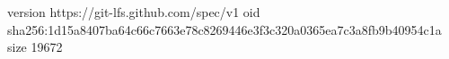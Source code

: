 version https://git-lfs.github.com/spec/v1
oid sha256:1d15a8407ba64c66c7663e78c8269446e3f3c320a0365ea7c3a8fb9b40954c1a
size 19672
